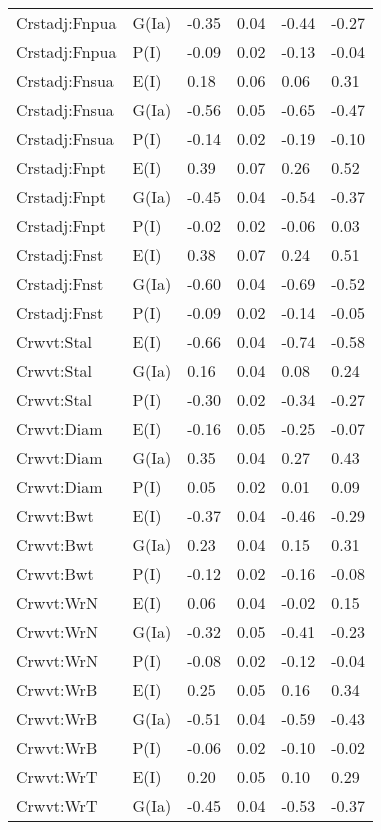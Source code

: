 \begin{center}
\begin{longtable}{|p{1.1in}|p{0.7in}|p{0.7in}|p{0.6in}|p{0.6in}|p{0.6in}|}
  Crstadj:Fnpua & G(Ia) & -0.35 & 0.04 & -0.44 & -0.27 \\ 
  Crstadj:Fnpua & P(I) & -0.09 & 0.02 & -0.13 & -0.04 \\ 
  Crstadj:Fnsua & E(I) & 0.18 & 0.06 & 0.06 & 0.31 \\ 
  Crstadj:Fnsua & G(Ia) & -0.56 & 0.05 & -0.65 & -0.47 \\ 
  Crstadj:Fnsua & P(I) & -0.14 & 0.02 & -0.19 & -0.10 \\ 
  Crstadj:Fnpt & E(I) & 0.39 & 0.07 & 0.26 & 0.52 \\ 
  Crstadj:Fnpt & G(Ia) & -0.45 & 0.04 & -0.54 & -0.37 \\ 
  Crstadj:Fnpt & P(I) & -0.02 & 0.02 & -0.06 & 0.03 \\ 
  Crstadj:Fnst & E(I) & 0.38 & 0.07 & 0.24 & 0.51 \\ 
  Crstadj:Fnst & G(Ia) & -0.60 & 0.04 & -0.69 & -0.52 \\ 
  Crstadj:Fnst & P(I) & -0.09 & 0.02 & -0.14 & -0.05 \\ 
  Crwvt:Stal & E(I) & -0.66 & 0.04 & -0.74 & -0.58 \\ 
  Crwvt:Stal & G(Ia) & 0.16 & 0.04 & 0.08 & 0.24 \\ 
  Crwvt:Stal & P(I) & -0.30 & 0.02 & -0.34 & -0.27 \\ 
  Crwvt:Diam & E(I) & -0.16 & 0.05 & -0.25 & -0.07 \\ 
  Crwvt:Diam & G(Ia) & 0.35 & 0.04 & 0.27 & 0.43 \\ 
  Crwvt:Diam & P(I) & 0.05 & 0.02 & 0.01 & 0.09 \\ 
  Crwvt:Bwt & E(I) & -0.37 & 0.04 & -0.46 & -0.29 \\ 
  Crwvt:Bwt & G(Ia) & 0.23 & 0.04 & 0.15 & 0.31 \\ 
  Crwvt:Bwt & P(I) & -0.12 & 0.02 & -0.16 & -0.08 \\ 
  Crwvt:WrN & E(I) & 0.06 & 0.04 & -0.02 & 0.15 \\ 
  Crwvt:WrN & G(Ia) & -0.32 & 0.05 & -0.41 & -0.23 \\ 
  Crwvt:WrN & P(I) & -0.08 & 0.02 & -0.12 & -0.04 \\ 
  Crwvt:WrB & E(I) & 0.25 & 0.05 & 0.16 & 0.34 \\ 
  Crwvt:WrB & G(Ia) & -0.51 & 0.04 & -0.59 & -0.43 \\ 
  Crwvt:WrB & P(I) & -0.06 & 0.02 & -0.10 & -0.02 \\ 
  Crwvt:WrT & E(I) & 0.20 & 0.05 & 0.10 & 0.29 \\ 
  Crwvt:WrT & G(Ia) & -0.45 & 0.04 & -0.53 & -0.37 \\ 

\end{longtable}
\end{center}
